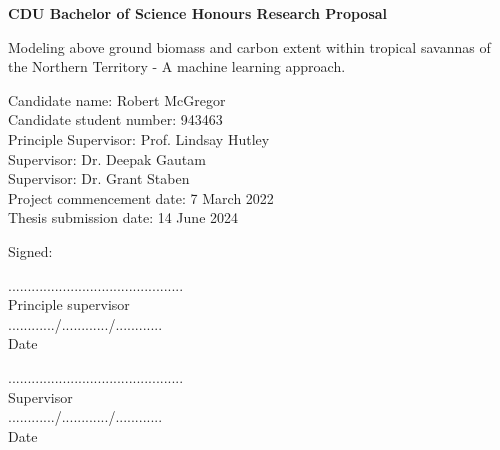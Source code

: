 



{\selectfont

\LARGE{
\bfseries{CDU Bachelor of Science Honours Research Proposal}
}

\vspace{5mm} %
\large{Modeling above ground biomass and carbon extent within tropical savannas of the Northern Territory - A machine learning approach.
}
}




\vspace{12mm} %

Candidate name: Robert McGregor
\\Candidate student number: 943463
\\Principle Supervisor: Prof. Lindsay Hutley
\\Supervisor: Dr. Deepak Gautam 
\\Supervisor: Dr. Grant Staben
\\Project commencement date: 7 March 2022
\\Thesis submission date: 14 June 2024



\vspace{5mm} %


Signed:

\vspace{1.5cm} %
\begin{multicols}{2}
............................................. \\
Principle supervisor \\


............/............/............\\
Date \\
\end{multicols}


\vspace{3mm} %
\begin{multicols}{2}
............................................. \\
Supervisor \\


............/............/............\\
Date \\
\end{multicols}

